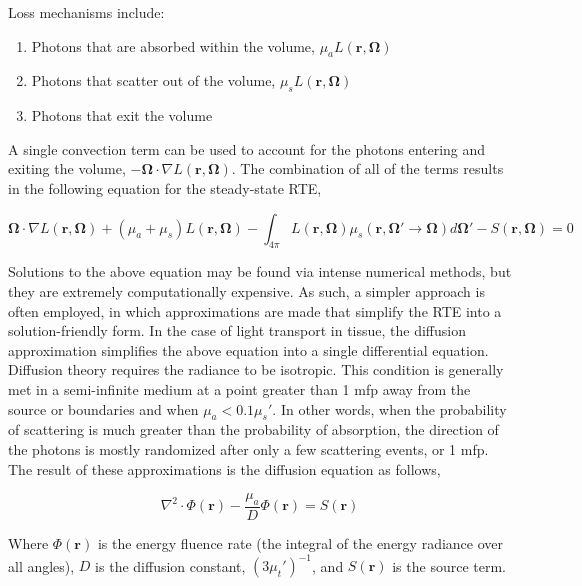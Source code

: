 \noindent Loss mechanisms include:
\begin{enumerate}
	\item Photons that are absorbed within the volume, $ \mu_a L(\mathbf{r},\mathbf{\Omega}) $
	\item Photons that scatter out of the volume, $ \mu_s L(\mathbf{r},\mathbf{\Omega}) $
	\item Photons that exit the volume
\end{enumerate}

\noindent A single convection term can be used to account for the photons entering and exiting the volume, $-\mathbf{\Omega}\cdot\nabla L(\mathbf{r},\mathbf{\Omega})$. The combination of all of the terms results in the following equation for the steady-state RTE,\cite{Farrell2003}

\begin{equation}
\label{eq:rte}
\mathbf{\Omega}\cdot\nabla L(\mathbf{r},\mathbf{\Omega}) + (\mu_a + \mu_s) L(\mathbf{r},\mathbf{\Omega}) - \int_{4\pi} L(\mathbf{r},\mathbf{\Omega}) \mu_s(\mathbf{r},\mathbf{\Omega}' \rightarrow \mathbf{\Omega}) d \mathbf{\Omega'} - S(\mathbf{r},\mathbf{\Omega}) = 0
\end{equation}

Solutions to the above equation may be found via intense numerical methods, but they are extremely computationally expensive. As such, a simpler approach is often employed, in which approximations are made that simplify the RTE into a solution-friendly form. In the case of light transport in tissue, the diffusion approximation simplifies the above equation into a single differential equation.
Diffusion theory requires the radiance to be isotropic. This condition is generally met in a semi-infinite medium at a point greater than 1 mfp away from the source or boundaries\cite{Jacques2004} and when $ \mu_a < 0.1\mu_s'$.\cite{Wilson2008} In other words, when the probability of scattering is much greater than the probability of absorption, the direction of the photons is mostly randomized after only a few scattering events, or 1 mfp. The result of these approximations is the diffusion equation as follows,

\begin{equation}
\label{eq:diffeq}
\nabla^2 \cdot \Phi(\mathbf{r}) - \frac{\mu_a}{D}\Phi(\mathbf{r}) = S(\mathbf{r})
\end{equation}

Where $\Phi(\mathbf{r})$ is the energy fluence rate (the integral of the energy radiance over all angles), $D$ is the diffusion constant, $(3\mu_t')^{-1}$, and $S(\mathbf{r})$ is the source term.


